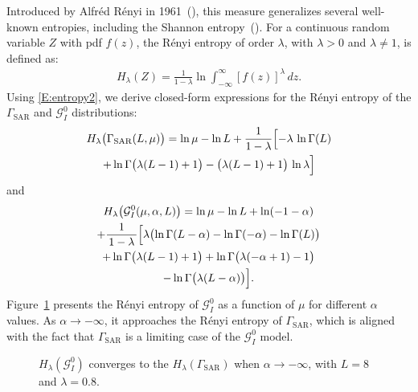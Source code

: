 \documentclass[
  letterpaper,
  11pt,
  english,
  doublespacing,
  headsepline,
  consistentlayout,
  oneside,
  openany]{MastersDoctoralThesis}
\begin{document}
Introduced by Alfréd Rényi in
1961~(), this measure
generalizes several well-known entropies, including the Shannon
entropy~(). For a
continuous random variable \(Z\) with pdf \(f(z)\), the Rényi entropy of
order \(\lambda\), with \(\lambda > 0\) and \(\lambda \neq 1\), is
defined as: \begin{align}
\label{E:entropy2}
H_\lambda(Z) = \frac{1}{1 - \lambda} \ln \int_{-\infty}^{\infty} [f(z)]^\lambda \, dz.
\end{align} Using \eqref{E:entropy2}, we derive closed-form expressions
for the Rényi entropy of the \(\Gamma_{\mathrm{SAR}}\) and
\(\mathcal{G}^0_I\) distributions: \begin{multline}
\label{eq-HGammaSAR}
H_\lambda\bigl(\Gamma_{\text{SAR}}(L, \mu)\bigr)
= 
\ln \mu - \ln L + \frac{1}{1-\lambda}
\Bigl[
  -\lambda\,\ln\Gamma(L) \\  + \ln\Gamma\bigl(\lambda(L-1)+1\bigr)  - \bigl(\lambda(L-1)+1\bigr)\,\ln\lambda
\Bigr]
\end{multline} and \begin{multline}\label{eq-HGI0}
H_\lambda\bigl(\mathcal{G}^0_I(\mu, \alpha, L)\bigr)=\ln\mu-\ln L +\ln(-1 - \alpha)\\
+ \frac{1}{\,1 - \lambda\,}
\Bigl[
   \lambda\bigl(
      \ln\Gamma(L - \alpha)
      -\ln\Gamma(-\alpha)
      -\ln\Gamma(L)
   \bigr)\\
   +\ln\Gamma\bigl(\lambda(L - 1) + 1\bigr)
   +\ln\Gamma\bigl(\lambda(-\alpha + 1) - 1\bigr)\\
   -\ln\Gamma\bigl(\lambda(L - \alpha)\bigr)
\Bigr].
\end{multline} Figure~\ref{fig-plot} presents the Rényi entropy of
\(\mathcal{G}^0_I\) as a function of \(\mu\) for different \(\alpha\)
values. As \(\alpha \to -\infty\), it approaches the Rényi entropy of
\(\Gamma_{\text{SAR}}\), which is aligned with the fact that
\(\Gamma_{\text{SAR}}\) is a limiting case of the \(\mathcal{G}^0_I\)
model.

\begin{figure}[hbt]

\caption{\label{fig-plot}\(H_{\lambda}(\mathcal{G}^0_I)\) converges to
the \(H_{\lambda}(\Gamma_{\text{SAR}})\) when \(\alpha\to-\infty\), with
\(L=8\) and \(\lambda=0.8\).}


\end{figure}%
\end{document}
